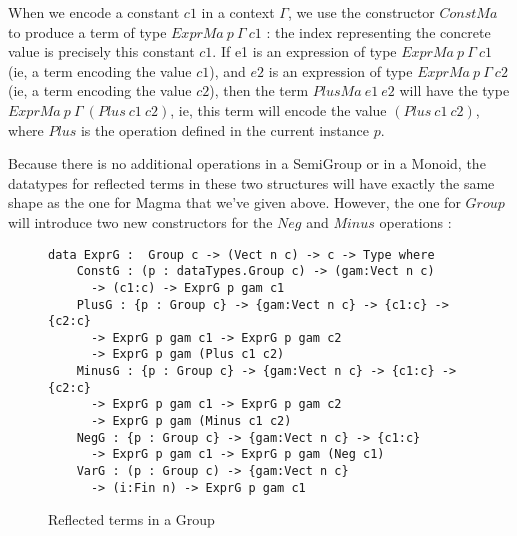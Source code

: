 When we encode a constant $c1$ in a context $\Gamma$, we use the constructor $ConstMa$ to produce a term of type $ExprMa\ p\ \Gamma\ c1$ : the index representing the concrete value is precisely this constant $c1$.
If e1 is an expression of type $ExprMa\ p\ \Gamma\ c1$ (ie, a term encoding the value $c1$), and $e2$ is an expression of type $ExprMa\ p\ \Gamma\ c2$ (ie, a term encoding the value $c2$), then the term $PlusMa\ e1\ e2$ will have the type $ExprMa\ p\ \Gamma\ (Plus\ c1\ c2)$, ie, this term will encode the value $(Plus\ c1\ c2)$, where $Plus$ is the operation defined in the current instance $p$.


%
%
Because there is no additional operations in a SemiGroup or in a Monoid, the datatypes for reflected terms in these two structures will have exactly the same shape as the one for Magma that we've given above.
However, the one for $Group$ will introduce two new constructors for the $Neg$ and $Minus$ operations :


\begin{figure}[H]
\figrule
\begin{center}
\begin{verbatim}
data ExprG :  Group c -> (Vect n c) -> c -> Type where
    ConstG : (p : dataTypes.Group c) -> (gam:Vect n c) 
      -> (c1:c) -> ExprG p gam c1
    PlusG : {p : Group c} -> {gam:Vect n c} -> {c1:c} -> {c2:c} 
      -> ExprG p gam c1 -> ExprG p gam c2 
      -> ExprG p gam (Plus c1 c2)
    MinusG : {p : Group c} -> {gam:Vect n c} -> {c1:c} -> {c2:c} 
      -> ExprG p gam c1 -> ExprG p gam c2 
      -> ExprG p gam (Minus c1 c2)
    NegG : {p : Group c} -> {gam:Vect n c} -> {c1:c} 
      -> ExprG p gam c1 -> ExprG p gam (Neg c1)
    VarG : (p : Group c) -> {gam:Vect n c} 
      -> (i:Fin n) -> ExprG p gam c1
\end{verbatim}
\end{center}
\caption{Reflected terms in a Group}
\figrule
\end{figure}

